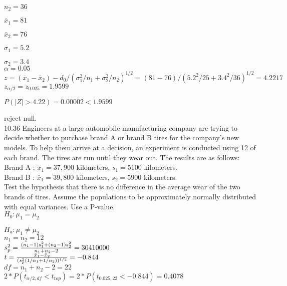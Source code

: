$n_2 = 36$

$\bar{x}_1 = 81$

$\bar{x}_2 = 76$

$\sigma_1 = 5.2$

$\sigma_2 = 3.4$ \\

$\alpha = 0.05$ \\


$z = (\bar{x}_1 - \bar{x}_2)-d_0/(\sigma_1^2/n_1 + \sigma_2^2/n_2)^{1/2}= (81-76)/(5.2^2 /25 + 3.4^2 /36)^{1/2} = 4.2217$ \\


$z_{\alpha/2} = z_{0.025} = 1.9599$

$P(|Z| > 4.22) = 0.00002 < 1.9599$

reject null. \\

10.36 Engineers at a large automobile manufacturing company are trying to decide whether to purchase brand A or brand B tires for the company's new models. To help them arrive at a decision, an experiment is conducted using 12 of each brand. The tires are run until they wear out. The results are as follows: \\

Brand A : $\bar{x}_1 = 37,900$ kilometers,
$s_1 = 5100$ kilometers. \\

Brand B : $\bar{x}_1 = 39,800$ kilometers,
$s_2 = 5900$ kilometers. \\

Test the hypothesis that there is no difference in the average wear of the two brands of tires. Assume the populations to be approximately normally distributed with equal variances. Use a P-value. \\

$H_0 : \mu_1 = \mu_2$

$H_a : \mu_1 \neq \mu_2$ \\

$n_1 = n_2 = 12$ \\

$s_p^2 = \frac{(n_1 - 1)s_1^2 + (n_2 - 1)s_2^2}{n_1 + n_2 - 2}
 = 30410000$ \\

$t = \frac{\bar{x}_1 - \bar{x}_2}{(s^2_p(1/n_1 + 1/n_2))^{1/2}}
= -0.844$ \\

$df = n_1 + n_2 - 2 = 22$ \\

$2*P(t_{\alpha/2,df} < t_{top}) = 2*P(t_{0.025,22} < -0.844) = 0.4078$ \\

